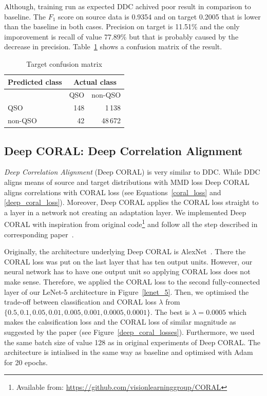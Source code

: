 Although, training run as expected
DDC achived poor result in comparison to baseline.
The \(F_1\) score on source data is 0.9354 and on target 0.2005
that is lower than the baseline in both cases.
Precision on target is 11.51\% and
the only imporovement is recall of value 77.89\%
but that is probably caused by the decrease in precision.
Table~\ref{ddc_confusion} shows a confusion matrix of the result.

\begin{table}
	\begin{center}
	\begin{tabular}{|l|r|r|}
		\hline
		Predicted class & \multicolumn{2}{c|}{Actual class} \\
		\hline \hline
		& QSO & non-QSO \\ \hline
		QSO & 148 & 1\,138 \\ \hline
		non-QSO & 42 & 48\,672 \\ \hline
	\end{tabular}
	\end{center}
	\caption{Target confusion matrix}
	\label{ddc_confusion}
\end{table}

\subsection{Deep CORAL: Deep Correlation Alignment}

\textit{Deep Correlation Alignment} (Deep CORAL) is very similar to DDC.
While DDC aligns means of source and target distributions with MMD loss
Deep CORAL aligns correlations with CORAL loss
(see Equations~\ref{coral_loss} and \ref{deep_coral_loss}).
Moreover, Deep CORAL applies the CORAL loss straight to a layer in a network
not creating an adaptation layer.
We implemented Deep CORAL with inspiration from original
code\footnote{Available from: \url{https://github.com/visionlearninggroup/CORAL}}
and follow all the step described in corresponding paper~\cite{sun2016}.

Originally, the architecture underlying Deep CORAL is AlexNet~\cite{krizhevsky2012}.
There the CORAL loss was put on the last layer that has ten output units.
However, our neural network has to have one output unit
so applying CORAL loss does not make sense.
Therefore, we applied the CORAL loss to the second fully-connected layer
of our LeNet-5 architecture in Figure~\ref{lenet_5}.
Then, we optimised the trade-off between classification and CORAL loss
\(\lambda\) from \(\{0.5, 0.1, 0.05, 0.01, 0.005, 0.001, 0.0005, 0.0001\}\).
The best is \(\lambda = 0.0005\) which makes the calssification loss
and the CORAL loss of similar magnitude as suggested by the paper
(see Figure~\ref{deep_coral_losses}).
Furthermore, we used the same batch size of value 128
as in original experiments of Deep CORAL.
The architecture is intialised in the same way as baseline
and optimised with Adam for 20 epochs.

